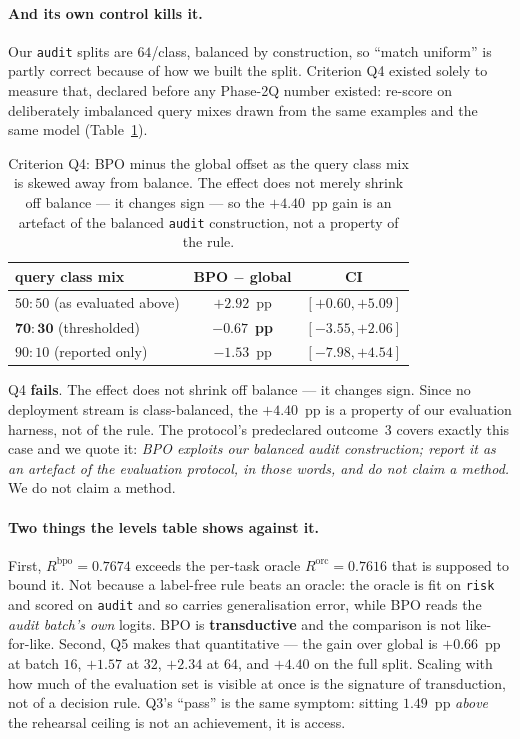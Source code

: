 \paragraph{And its own control kills it.}
Our \texttt{audit} splits are $64$/class, balanced by construction, so ``match
uniform'' is partly correct because of how we built the split. Criterion Q4 existed
solely to measure that, declared before any Phase-2Q number existed: re-score on
deliberately imbalanced query mixes drawn from the same examples and the same model
(Table~\ref{tab:bpo-classmix}).
\begin{table}[t]
\centering
\small
\caption{Criterion Q4: BPO minus the global offset as the query class mix is skewed
away from balance. The effect does not merely shrink off balance --- it changes
sign --- so the $+4.40$~pp gain is an artefact of the balanced \texttt{audit}
construction, not a property of the rule.}
\label{tab:bpo-classmix}
\begin{tabular}{lcc}
\toprule
query class mix & BPO $-$ global & CI \\
\midrule
$50{:}50$ (as evaluated above) & $+2.92$~pp & $[+0.60,+5.09]$ \\
$\mathbf{70{:}30}$ (thresholded) & $\mathbf{-0.67}$~\textbf{pp} & $[-3.55,+2.06]$ \\
$90{:}10$ (reported only) & $-1.53$~pp & $[-7.98,+4.54]$ \\
\bottomrule
\end{tabular}
\end{table}
Q4 \textbf{fails}. The effect does not shrink off balance --- it changes sign. Since
no deployment stream is class-balanced, the $+4.40$~pp is a property of our
evaluation harness, not of the rule. The protocol's predeclared outcome~3 covers
exactly this case and we quote it: \emph{BPO exploits our balanced audit
construction; report it as an artefact of the evaluation protocol, in those words,
and do not claim a method.} We do not claim a method.

\paragraph{Two things the levels table shows against it.}
First, $R^{\mathrm{bpo}}=0.7674$ exceeds the per-task oracle $R^{\mathrm{orc}}=0.7616$
that is supposed to bound it. Not because a label-free rule beats an oracle: the
oracle is fit on \texttt{risk} and scored on \texttt{audit} and so carries
generalisation error, while BPO reads the \emph{audit batch's own} logits. BPO is
\textbf{transductive} and the comparison is not like-for-like. Second, Q5 makes that
quantitative --- the gain over global is $+0.66$~pp at batch $16$, $+1.57$ at $32$,
$+2.34$ at $64$, and $+4.40$ on the full split. Scaling with how much of the
evaluation set is visible at once is the signature of transduction, not of a decision
rule. Q3's ``pass'' is the same symptom: sitting $1.49$~pp \emph{above} the rehearsal
ceiling is not an achievement, it is access.

